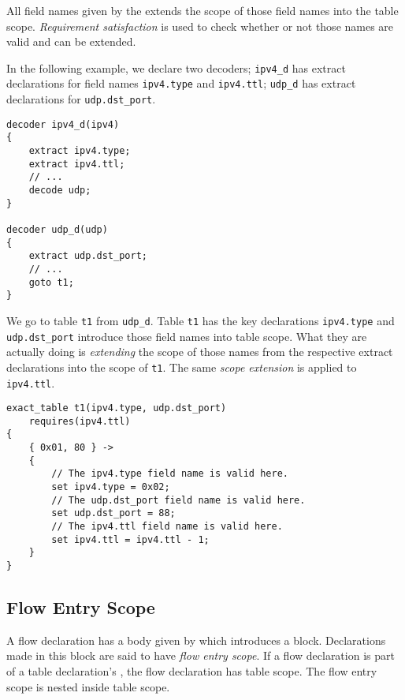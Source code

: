 All field names given by the  extends the scope of those field names into the table scope. \textit{Requirement satisfaction} is used to check whether or not those names are valid and can be extended.

In the following example, we declare two decoders; \texttt{ipv4\_d} has extract declarations for field names \texttt{ipv4.type} and \texttt{ipv4.ttl}; \texttt{udp\_d} has extract declarations for \texttt{udp.dst\_port}.

\noindent\begin{minipage}{\linewidth}
\begin{lstlisting}
decoder ipv4_d(ipv4)
{
	extract ipv4.type;
	extract ipv4.ttl;
	// ...
	decode udp;
}

decoder udp_d(udp)
{
	extract udp.dst_port;
	// ...
	goto t1;
}
\end{lstlisting}
\end{minipage}

We go to table \texttt{t1} from \texttt{udp\_d}. Table \texttt{t1} has the key declarations \texttt{ipv4.type} and \texttt{udp.dst\_port} introduce those field names into table scope. What they are actually doing is \textit{extending} the scope of those names from the respective extract declarations into the scope of \texttt{t1}. The same \textit{scope extension} is applied to \texttt{ipv4.ttl}.

\noindent\begin{minipage}{\linewidth}
\begin{lstlisting}
exact_table t1(ipv4.type, udp.dst_port)
	requires(ipv4.ttl)
{
	{ 0x01, 80 } ->
	{
		// The ipv4.type field name is valid here.
		set ipv4.type = 0x02;
		// The udp.dst_port field name is valid here.
		set udp.dst_port = 88;
		// The ipv4.ttl field name is valid here.
		set ipv4.ttl = ipv4.ttl - 1;
	}
}
\end{lstlisting}
\end{minipage}

\subsection{Flow Entry Scope} \label{flow_scope}

A flow declaration has a body given by  which introduces a block. Declarations made in this block are said to have \textit{flow entry scope}. If a flow declaration is part of a table declaration's , the flow declaration has table scope. The flow entry scope is nested inside table scope.


